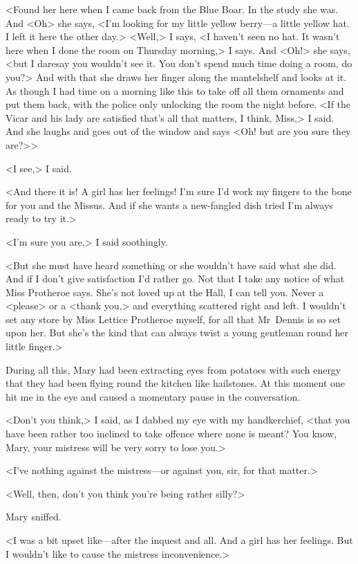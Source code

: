 <Found her here when I came back from the Blue Boar. In the study she was. And <Oh> she says, <I'm looking for my little yellow berry—a little yellow hat. I left it here the other day.> <Well,> I says, <I haven't seen no hat. It wasn't here when I done the room on Thursday morning,> I says. And <Oh!> she says, <but I daresay you wouldn't see it. You don't spend much time doing a room, do you?> And with that she draws her finger along the mantelshelf and looks at it. As though I had time on a morning like this to take off all them ornaments and put them back, with the police only unlocking the room the night before. <If the Vicar and his lady are satisfied that's all that matters, I think, Miss,> I said. And she laughs and goes out of the window and says <Oh! but are you sure they are?>>

<I see,> I said.

<And there it is! A girl has her feelings! I'm sure I'd work my fingers to the bone for you and the Missus. And if she wants a new-fangled dish tried I'm always ready to try it.>

<I'm sure you are,> I said soothingly.

<But she must have heard something or she wouldn't have said what she did. And if I don't give satisfaction I'd rather go. Not that I take any notice of what Miss Protheroe says. She's not loved up at the Hall, I can tell you. Never a <please> or a <thank you,> and everything scattered right and left. I wouldn't set any store by Miss Lettice Protheroe myself, for all that Mr~Dennis is so set upon her. But she's the kind that can always twist a young gentleman round her little finger.>

During all this, Mary had been extracting eyes from potatoes with such energy that they had been flying round the kitchen like hailstones. At this moment one hit me in the eye and caused a momentary pause in the conversation.

<Don't you think,> I said, as I dabbed my eye with my handkerchief, <that you have been rather too inclined to take offence where none is meant? You know, Mary, your mistress will be very sorry to lose you.>

<I've nothing against the mistress—or against you, sir, for that matter.>

<Well, then, don't you think you're being rather silly?>

Mary sniffed.

<I was a bit upset like—after the inquest and all. And a girl has her feelings. But I wouldn't like to cause the mistress inconvenience.>

